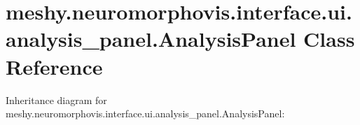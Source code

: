 \hypertarget{classmeshy_1_1neuromorphovis_1_1interface_1_1ui_1_1analysis__panel_1_1AnalysisPanel}{}\section{meshy.\+neuromorphovis.\+interface.\+ui.\+analysis\+\_\+panel.\+Analysis\+Panel Class Reference}
\label{classmeshy_1_1neuromorphovis_1_1interface_1_1ui_1_1analysis__panel_1_1AnalysisPanel}


 




Inheritance diagram for meshy.\+neuromorphovis.\+interface.\+ui.\+analysis\+\_\+panel.\+Analysis\+Panel\+:
